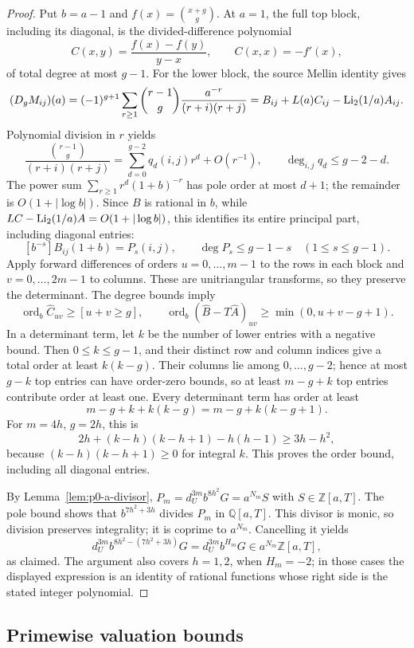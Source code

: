 \begin{proof}
Put $b=a-1$ and $f(x)=\binom{x+g}{g}$.  At $a=1$, the full top block,
including its diagonal, is the divided-difference polynomial
\[
 C(x,y)=\frac{f(x)-f(y)}{y-x},\qquad C(x,x)=-f'(x),
\]
of total degree at most $g-1$.  For the lower block, the source Mellin
identity gives
\[
 (D_gM_{ij})(a)=(-1)^{g+1}\sum_{r\ge1}
   \binom{r-1}{g}\frac{a^{-r}}{(r+i)(r+j)}
 =B_{ij}+L(a)C_{ij}-\operatorname{Li}_2(1/a)A_{ij}.
\]
Polynomial division in $r$ yields
\[
 \frac{\binom{r-1}{g}}{(r+i)(r+j)}
 =\sum_{d=0}^{g-2}q_d(i,j)r^d+O(r^{-1}),
 \qquad \deg_{i,j}q_d\le g-2-d.
\]
The power sum $\sum_{r\ge1}r^d(1+b)^{-r}$ has pole order at most $d+1$;
the remainder is $O(1+|\log b|)$.  Since $B$ is rational in $b$, while
$LC-\operatorname{Li}_2(1/a)A=O(1+|\log b|)$, this identifies its entire principal
part, including diagonal entries:
\[
 [b^{-s}]B_{ij}(1+b)=P_s(i,j),\qquad
 \deg P_s\le g-1-s\quad(1\le s\le g-1).
\]
Apply forward differences of orders $u=0,\ldots,m-1$ to the rows in each
block and $v=0,\ldots,2m-1$ to columns.  These are unitriangular transforms,
so they preserve the determinant.  The degree bounds imply
\[
 \operatorname{ord}_b\widehat C_{uv}\ge[ u+v\ge g],\qquad
 \operatorname{ord}_b(\widehat B-T\widehat A)_{uv}
       \ge\min(0,u+v-g+1).
\]
In a determinant term, let $k$ be the number of lower entries with a negative
bound.  Then $0\le k\le g-1$, and their distinct row and column indices
give a total order at least $k(k-g)$.  Their columns lie among
$0,\ldots,g-2$; hence at most $g-k$ top entries can have order-zero bounds,
so at least $m-g+k$ top entries contribute order at least one.  Every
determinant term has order at least
\[
 m-g+k+k(k-g)=m-g+k(k-g+1).
\]
For $m=4h$, $g=2h$, this is
\[
 2h+(k-h)(k-h+1)-h(h-1)\ge3h-h^2,
\]
because $(k-h)(k-h+1)\ge0$ for integral $k$.  This proves the order bound,
including all diagonal entries.

By Lemma~\ref{lem:p0-a-divisor},
$P_m=d_U^{3m}b^{8h^2}G=a^{N_m}S$ with $S\in\mathbb Z[a,T]$.  The pole
bound shows that $b^{7h^2+3h}$ divides $P_m$ in $\mathbb Q[a,T]$.
This divisor is monic, so division preserves integrality; it is coprime to
$a^{N_m}$.  Cancelling it yields
\[
 d_U^{3m}b^{8h^2-(7h^2+3h)}G
 =d_U^{3m}b^{H_m}G\in a^{N_m}\mathbb Z[a,T],
\]
as claimed.  The argument also covers $h=1,2$, when $H_m=-2$; in those
cases the displayed expression is an identity of rational functions whose
right side is the stated integer polynomial.
\end{proof}

\subsection{Primewise valuation bounds}


